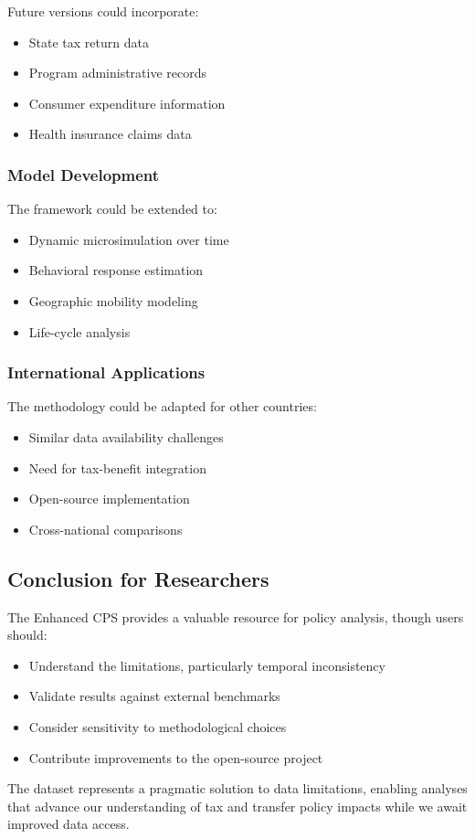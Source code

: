 Future versions could incorporate:
\begin{itemize}
\item State tax return data
\item Program administrative records
\item Consumer expenditure information
\item Health insurance claims data
\end{itemize}

\subsubsection{Model Development}

The framework could be extended to:
\begin{itemize}
\item Dynamic microsimulation over time
\item Behavioral response estimation
\item Geographic mobility modeling
\item Life-cycle analysis
\end{itemize}

\subsubsection{International Applications}

The methodology could be adapted for other countries:
\begin{itemize}
\item Similar data availability challenges
\item Need for tax-benefit integration
\item Open-source implementation
\item Cross-national comparisons
\end{itemize}

\subsection{Conclusion for Researchers}

The Enhanced CPS provides a valuable resource for policy analysis, though users should:
\begin{itemize}
\item Understand the limitations, particularly temporal inconsistency
\item Validate results against external benchmarks
\item Consider sensitivity to methodological choices
\item Contribute improvements to the open-source project
\end{itemize}

The dataset represents a pragmatic solution to data limitations, enabling analyses that advance our understanding of tax and transfer policy impacts while we await improved data access.
